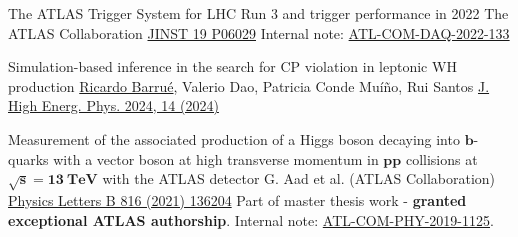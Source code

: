 


\begin{cventries}

    \cventry
    {The ATLAS Trigger System for LHC Run 3 and trigger performance in 2022}
    {The ATLAS Collaboration}
    {}
    {\href{https://doi.org/10.1088/1748-0221/19/06/P06029}{JINST 19 P06029}}
    {
        Internal note: \href{https://cds.cern.ch/record/2845056}{ATL-COM-DAQ-2022-133}
    }

    \cventry
    {Simulation-based inference in the search for CP violation in leptonic WH production}
    {\underline{Ricardo Barrué}, Valerio Dao, Patricia Conde Muíño, Rui Santos}
    {}
    {\href{https://doi.org/10.1007/JHEP04(2024)014}{J. High Energ. Phys. 2024, 14 (2024)}}
    {
    }%

    \cventry
    {Measurement of the associated production of a Higgs boson decaying into $\mathbf{b}$-quarks with a vector boson at high transverse momentum in $\mathbf{pp}$ collisions at $\mathbf{\sqrt{s}= 13 \:\text{TeV}}$ with the ATLAS detector}
    {G. Aad et al. (ATLAS Collaboration)}
    {}
    {\href{https://doi.org/10.1016/j.physletb.2021.136204}{Physics Letters B 816 (2021) 136204}}
    {
        Part of master thesis work - \textbf{granted exceptional ATLAS authorship}. Internal note: \href{https://cds.cern.ch/record/2688371}{ATL-COM-PHY-2019-1125}.
    }
    
\end{cventries}\vspace*{2mm}

